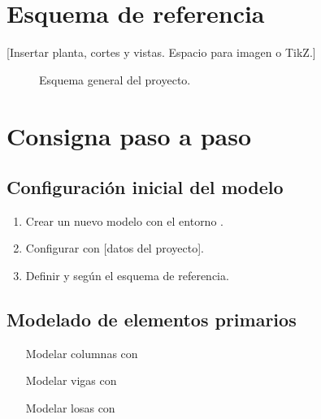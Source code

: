 \documentclass[11pt,a4paper]{article}
\begin{document}
\section{Esquema de referencia}
[Insertar planta, cortes y vistas. Espacio para imagen o TikZ.]

\begin{figure}[H]
\centering
{}
\caption{Esquema general del proyecto.}
\label{fig:esquema}
\end{figure}

\section{Consigna paso a paso}

\subsection{Configuración inicial del modelo}
\begin{enumerate}
    \item Crear un nuevo modelo con el entorno \entornoTekla.
    \item Configurar  con [datos del proyecto].
    \item Definir  y  según el esquema de referencia.
\end{enumerate}

\begin{tip}
\end{tip}

\subsection{Modelado de elementos primarios}
\begin{enumerate}
    \item [Modelar columnas con \tk{Concrete Column}]
    \item [Modelar vigas con \tk{Concrete Beam}]
    \item [Modelar losas con \tk{Concrete Slab}]
\end{enumerate}
\end{document}
